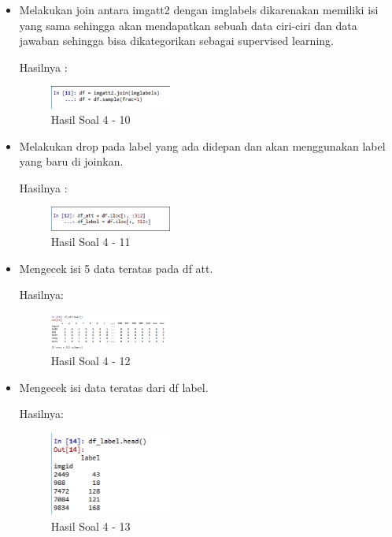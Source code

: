 \begin{enumerate}
\begin{itemize}
\item Melakukan join antara imgatt2 dengan imglabels dikarenakan memiliki isi yang sama sehingga akan mendapatkan sebuah data ciri-ciri dan data jawaban sehingga bisa dikategorikan sebagai supervised learning.

Hasilnya :
\begin{figure}[H]
	\centering
		\includegraphics[width=4cm]{figures/1174054/3/16.png}
		\caption{Hasil Soal 4 - 10}
\end{figure}
		
\item Melakukan drop pada label yang ada didepan dan akan menggunakan label yang baru di joinkan.

Hasilnya :
\begin{figure}[H]
	\centering
		\includegraphics[width=4cm]{figures/1174054/3/17.png}
		\caption{Hasil Soal 4 - 11}
\end{figure}
		
\item Mengecek isi 5 data teratas pada df att.

Hasilnya:
\begin{figure}[H]
	\centering
		\includegraphics[width=4cm]{figures/1174054/3/18.png}
		\caption{Hasil Soal 4 - 12}
\end{figure}
		
\item Mengecek isi data teratas dari df label.

Hasilnya:
\begin{figure}[H]
	\centering
		\includegraphics[width=4cm]{figures/1174054/3/19.png}
		\caption{Hasil Soal 4 - 13}
\end{figure}
		

\end{itemize}
\end{enumerate}

